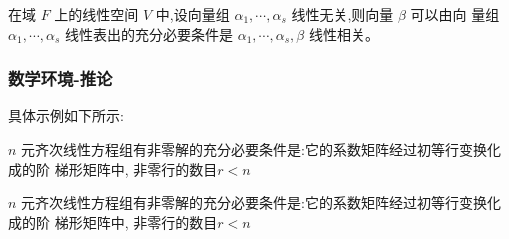 \begin{proposition*}
    在域 $F$ 上的线性空间 $V$ 中,设向量组 $\alpha_{1}, \cdots, \alpha_{s}$ 线性无关,则向量 $\beta$ 可以由向 量组 $\alpha_{1}, \cdots, \alpha_{s}$ 线性表出的充分必要条件是 $\alpha_{1}, \cdots, \alpha_{s}, \beta$ 线性相关。
\end{proposition*}


%
%
\subsubsection{数学环境-推论}
具体示例如下所示:
\begin{corollary}
    $n$ 元齐次线性方程组有非零解的充分必要条件是:它的系数矩阵经过初等行变换化成的阶
    梯形矩阵中, 非零行的数目$r<n$
\end{corollary}

\begin{tcblisting}{}
\begin{corollary}
    $n$ 元齐次线性方程组有非零解的充分必要条件是:它的系数矩阵经过初等行变换化成的阶
    梯形矩阵中, 非零行的数目$r<n$
\end{corollary}
\end{tcblisting}
%
